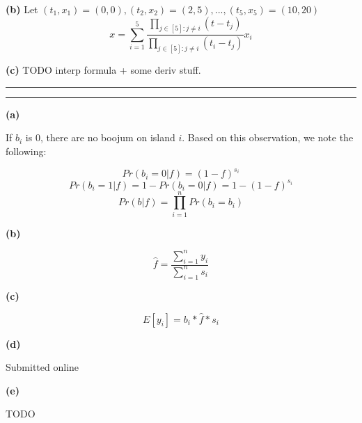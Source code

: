 \documentclass[11pt,letterpaper]{article}
\newcommand{\question}[1] {\vspace{.25in} \hrule\vspace{0.5em}
\noindent{\bf #1} \vspace{0.5em}
\hrule \vspace{.10in}}
\renewcommand{\part}[1] {\vspace{.10in} {\bf (#1)}}
\begin{document}
\part{b}
Let $(t_1, x_1) = (0,0), (t_2, x_2) = (2,5), ... , (t_5,x_5) = (10,20) $
$$x = \sum_{i=1}^{5} \frac{\prod_{j \in [5] : j \neq i} (t - t_j)}{\prod_{j \in [5] : j \neq i} (t_i - t_j)} x_i$$


\part{c}
TODO interp formula + some deriv stuff.

\question{4}
\part{a}

If $b_i$ is 0, there are no boojum on island $i$. Based on this observation, we note the following:

$$Pr(b_i = 0| f) = (1-f)^{s_i}$$
$$Pr(b_i = 1| f) = 1 - Pr(b_i = 0 | f) = 1 - (1-f)^{s_i}$$
$$Pr(b | f) = \prod_{i=1}^n Pr(b_i = b_i)$$

\part{b}

$$\hat{f} = \frac{\sum_{i=1}^n y_i}{\sum_{i=1}^n s_i} $$

\part{c}

$$E[y_i] = b_i * \hat{f} * s_i$$

\part{d}

Submitted online

\part{e}

TODO
\end{document}
